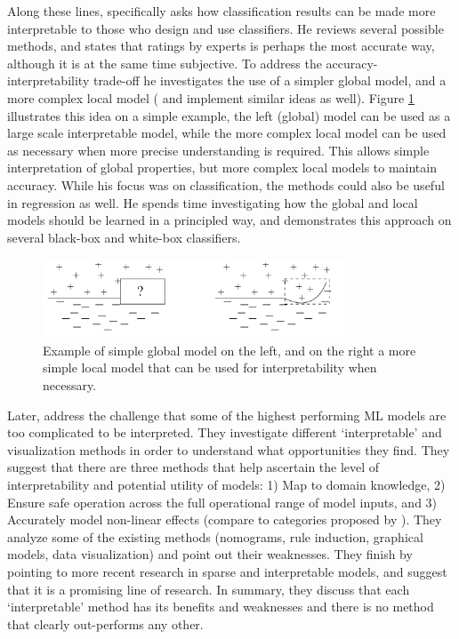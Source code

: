     Along these lines,  \citet{Ruping2006-xj} specifically asks how classification results can be made more interpretable to those who design and use classifiers. He reviews several possible methods, and states that ratings by experts is perhaps the most accurate way, although it is at the same time subjective. To address the accuracy-interpretability trade-off he investigates the use of a simpler global model, and a more complex local model (\citet{Otte2013-oo} and \citet{Ribeiro2016-uc} implement similar ideas as well). Figure \ref{fig:ruping} illustrates this idea on a simple example, the left (global) model can be used as a large scale interpretable model, while the more complex local model can be used as necessary when more precise understanding is required. This allows simple interpretation of global properties, but more complex local models to maintain accuracy. While his focus was on classification, the methods could also be useful in regression as well. He spends time investigating how the global and local models should be learned in a principled way, and demonstrates this approach on several black-box and white-box classifiers. 

    \begin{figure}[htbp]
    \centering
    \includegraphics[width=0.8\textwidth]{Figures/ruping_global_local.png}
    \caption{Example of simple global model on the left, and on the right a more simple local model that can be used for interpretability when necessary.}
    \label{fig:ruping}
    \end{figure}

    Later, \citet{Van_Belle2013-ph} address the challenge that some of the highest performing ML models are too complicated to be interpreted. They investigate different `interpretable' and visualization methods in order to understand what opportunities they find. They suggest that there are three methods that help ascertain the level of interpretability and potential utility of models: 1) Map to domain knowledge, 2) Ensure safe operation across the full operational range of model inputs, and 3) Accurately model non-linear effects (compare to categories proposed by \citet{Lipton2016-ug}). They analyze some of the existing methods (nomograms, rule induction, graphical models, data visualization) and point out their weaknesses. They finish by pointing to more recent research in sparse and interpretable models, and suggest that it is a promising line of research. In summary, they discuss that each `interpretable' method has its benefits and weaknesses and there is no method that clearly out-performs any other.


